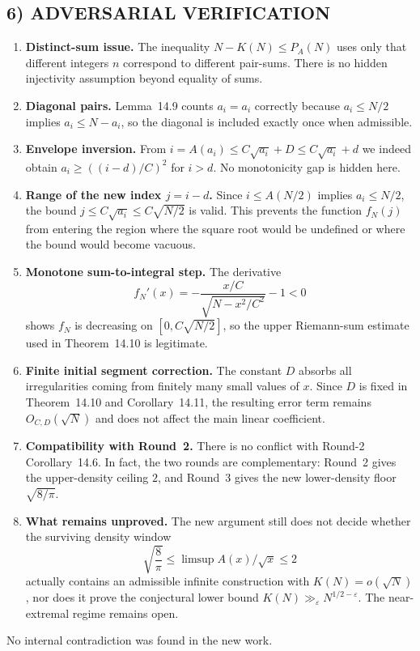 \subsection*{6) ADVERSARIAL VERIFICATION}
\begin{enumerate}
\item \textbf{Distinct-sum issue.} The inequality $N-K(N)\le P_A(N)$ uses only that different integers $n$ correspond to different pair-sums. There is no hidden injectivity assumption beyond equality of sums.
\item \textbf{Diagonal pairs.} Lemma~14.9 counts $a_i=a_i$ correctly because $a_i\le N/2$ implies $a_i\le N-a_i$, so the diagonal is included exactly once when admissible.
\item \textbf{Envelope inversion.} From $i=A(a_i)\le C\sqrt{a_i}+D\le C\sqrt{a_i}+d$ we indeed obtain $a_i\ge ((i-d)/C)^2$ for $i>d$. No monotonicity gap is hidden here.
\item \textbf{Range of the new index $j=i-d$.} Since $i\le A(N/2)$ implies $a_i\le N/2$, the bound $j\le C\sqrt{a_i}\le C\sqrt{N/2}$ is valid. This prevents the function $f_N(j)$ from entering the region where the square root would be undefined or where the bound would become vacuous.
\item \textbf{Monotone sum-to-integral step.} The derivative
\[
f_N'(x)=-\frac{x/C}{\sqrt{N-x^2/C^2}}-1<0
\]
shows $f_N$ is decreasing on $[0,C\sqrt{N/2}]$, so the upper Riemann-sum estimate used in Theorem~14.10 is legitimate.
\item \textbf{Finite initial segment correction.} The constant $D$ absorbs all irregularities coming from finitely many small values of $x$. Since $D$ is fixed in Theorem~14.10 and Corollary~14.11, the resulting error term remains $O_{C,D}(\sqrt N)$ and does not affect the main linear coefficient.
\item \textbf{Compatibility with Round~2.} There is no conflict with Round-2 Corollary~14.6. In fact, the two rounds are complementary: Round~2 gives the upper-density ceiling $2$, and Round~3 gives the new lower-density floor $\sqrt{8/\pi}$.
\item \textbf{What remains unproved.} The new argument still does not decide whether the surviving density window
\[
\sqrt{\frac{8}{\pi}}\le \limsup A(x)/\sqrt x\le 2
\]
actually contains an admissible infinite construction with $K(N)=o(\sqrt N)$, nor does it prove the conjectural lower bound $K(N)\gg_\varepsilon N^{1/2-\varepsilon}$. The near-extremal regime remains open.
\end{enumerate}
No internal contradiction was found in the new work.

